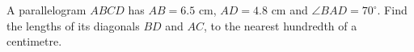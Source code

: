 A parallelogram $ABCD$ has $AB=6.5$ cm, $AD=4.8$ cm and $\angle BAD=70^\circ$. Find the lengths of its diagonals $BD$ and $AC$, to the nearest hundredth of a centimetre.
